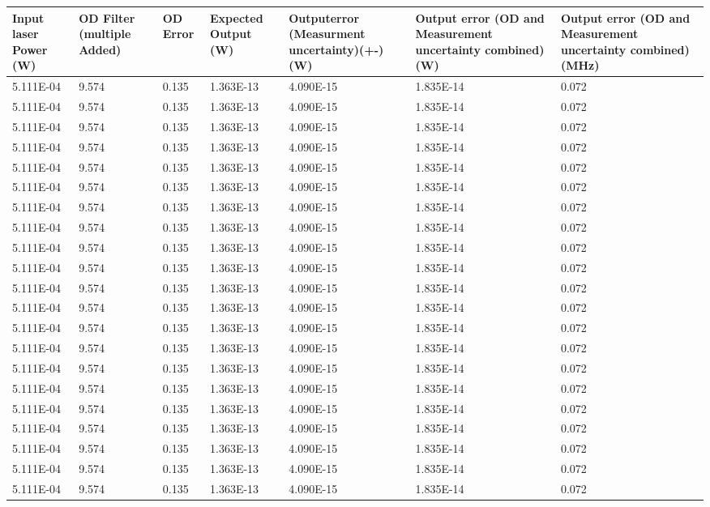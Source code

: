 \begin{table}[!ht]
    \centering
    \begin{tabular}{|l|l|l|l|l|l|l|}
    \hline
        Input laser Power (W) & OD Filter (multiple Added) & OD Error & Expected Output (W) & Outputerror (Measurment uncertainty)(+-) (W) & Output error (OD and Measurement uncertainty combined) (W) & Output error (OD and Measurement uncertainty combined) (MHz) \\ \hline
        5.111E-04 & 9.574 & 0.135 & 1.363E-13 & 4.090E-15 & 1.835E-14 & 0.072 \\ \hline
        5.111E-04 & 9.574 & 0.135 & 1.363E-13 & 4.090E-15 & 1.835E-14 & 0.072 \\ \hline
        5.111E-04 & 9.574 & 0.135 & 1.363E-13 & 4.090E-15 & 1.835E-14 & 0.072 \\ \hline
        5.111E-04 & 9.574 & 0.135 & 1.363E-13 & 4.090E-15 & 1.835E-14 & 0.072 \\ \hline
        5.111E-04 & 9.574 & 0.135 & 1.363E-13 & 4.090E-15 & 1.835E-14 & 0.072 \\ \hline
        5.111E-04 & 9.574 & 0.135 & 1.363E-13 & 4.090E-15 & 1.835E-14 & 0.072 \\ \hline
        5.111E-04 & 9.574 & 0.135 & 1.363E-13 & 4.090E-15 & 1.835E-14 & 0.072 \\ \hline
        5.111E-04 & 9.574 & 0.135 & 1.363E-13 & 4.090E-15 & 1.835E-14 & 0.072 \\ \hline
        5.111E-04 & 9.574 & 0.135 & 1.363E-13 & 4.090E-15 & 1.835E-14 & 0.072 \\ \hline
        5.111E-04 & 9.574 & 0.135 & 1.363E-13 & 4.090E-15 & 1.835E-14 & 0.072 \\ \hline
        5.111E-04 & 9.574 & 0.135 & 1.363E-13 & 4.090E-15 & 1.835E-14 & 0.072 \\ \hline
        5.111E-04 & 9.574 & 0.135 & 1.363E-13 & 4.090E-15 & 1.835E-14 & 0.072 \\ \hline
        5.111E-04 & 9.574 & 0.135 & 1.363E-13 & 4.090E-15 & 1.835E-14 & 0.072 \\ \hline
        5.111E-04 & 9.574 & 0.135 & 1.363E-13 & 4.090E-15 & 1.835E-14 & 0.072 \\ \hline
        5.111E-04 & 9.574 & 0.135 & 1.363E-13 & 4.090E-15 & 1.835E-14 & 0.072 \\ \hline
        5.111E-04 & 9.574 & 0.135 & 1.363E-13 & 4.090E-15 & 1.835E-14 & 0.072 \\ \hline
        5.111E-04 & 9.574 & 0.135 & 1.363E-13 & 4.090E-15 & 1.835E-14 & 0.072 \\ \hline
        5.111E-04 & 9.574 & 0.135 & 1.363E-13 & 4.090E-15 & 1.835E-14 & 0.072 \\ \hline
        5.111E-04 & 9.574 & 0.135 & 1.363E-13 & 4.090E-15 & 1.835E-14 & 0.072 \\ \hline
        5.111E-04 & 9.574 & 0.135 & 1.363E-13 & 4.090E-15 & 1.835E-14 & 0.072 \\ \hline
        5.111E-04 & 9.574 & 0.135 & 1.363E-13 & 4.090E-15 & 1.835E-14 & 0.072 \\ \hline
    \end{tabular}
\end{table}